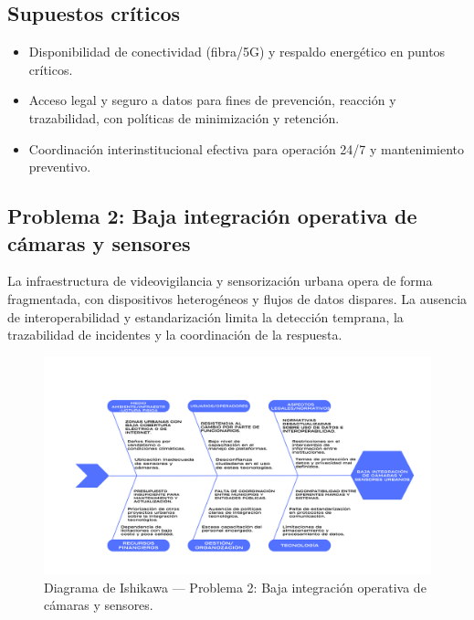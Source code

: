 \documentclass[12pt,a4paper]{article}
\begin{document}
\subsection*{Supuestos críticos}
\begin{itemize}
    \item Disponibilidad de conectividad (fibra/5G) y respaldo energético en puntos críticos.
    \item Acceso legal y seguro a datos para fines de prevención, reacción y trazabilidad, con políticas de minimización y retención.
    \item Coordinación interinstitucional efectiva para operación 24/7 y mantenimiento preventivo.
\end{itemize}

\subsection*{Problema 2: Baja integración operativa de cámaras y sensores}

\noindent La infraestructura de videovigilancia y sensorización urbana opera de forma fragmentada, con dispositivos heterogéneos y flujos de datos dispares. La ausencia de interoperabilidad y estandarización limita la detección temprana, la trazabilidad de incidentes y la coordinación de la respuesta.

\begin{figure}[htbp]
  \centering
  \includegraphics[width=\linewidth]{ishikawa_p2.png}
  \caption{Diagrama de Ishikawa — Problema 2: Baja integración operativa de cámaras y sensores.}
  \label{fig:ishikawa-p2}
\end{figure}
\end{document}
